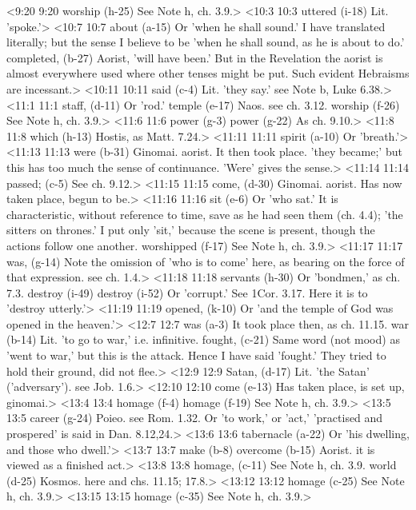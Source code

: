 <9:20 9:20  worship (h-25)  See Note h, ch. 3.9.>
<10:3 10:3  uttered (i-18)  Lit. 'spoke.'>
<10:7 10:7  about (a-15)  Or 'when he shall sound.' I have translated literally; but  the sense I believe to be 'when he shall sound, as he is about  to do.'
  completed, (b-27)  Aorist, 'will have been.' But in the Revelation the aorist is  almost everywhere used where other tenses might be put. Such  evident Hebraisms are incessant.>
<10:11 10:11  said (c-4)  Lit. 'they say.' see Note b, Luke 6.38.>
<11:1 11:1  staff, (d-11)  Or 'rod.'
  temple (e-17)  Naos. see ch. 3.12.
  worship (f-26)  See Note h, ch. 3.9.>
<11:6 11:6  power (g-3)  power (g-22)
  As ch. 9.10.>
<11:8 11:8  which (h-13)  Hostis, as Matt. 7.24.>
<11:11 11:11  spirit (a-10)  Or 'breath.'>
<11:13 11:13  were (b-31)  Ginomai. aorist. It then took place. 'they became;' but  this has too much the sense of continuance. 'Were' gives the  sense.>
<11:14 11:14  passed; (c-5)  See ch. 9.12.>
<11:15 11:15  come, (d-30)  Ginomai. aorist. Has now taken place, begun to be.>
<11:16 11:16  sit (e-6)  Or 'who sat.' It is characteristic, without reference to  time, save as he had seen them (ch. 4.4); 'the sitters on  thrones.' I put only 'sit,' because the scene is present,  though the actions follow one another.
  worshipped (f-17)  See Note h, ch. 3.9.>
<11:17 11:17  was, (g-14)  Note the omission of 'who is to come' here, as bearing on the  force of that expression. see ch. 1.4.>
<11:18 11:18  servants (h-30)  Or 'bondmen,' as ch. 7.3.
  destroy (i-49)  destroy (i-52)
  Or 'corrupt.' See 1Cor. 3.17. Here it is to 'destroy  utterly.'>
<11:19 11:19  opened, (k-10)  Or 'and the temple of God was opened in the heaven.'>
<12:7 12:7  was (a-3)  It took place then, as ch. 11.15.
  war (b-14)  Lit. 'to go to war,' i.e. infinitive.
  fought, (c-21)  Same word (not mood) as 'went to war,' but this is the  attack. Hence I have said 'fought.' They tried to hold their  ground, did not flee.>
<12:9 12:9  Satan, (d-17)  Lit. 'the Satan' ('adversary'). see Job. 1.6.>
<12:10 12:10  come (e-13)  Has taken place, is set up, ginomai.>
<13:4 13:4  homage (f-4)  homage (f-19)
  See Note h, ch. 3.9.>
<13:5 13:5  career (g-24)  Poieo. see Rom. 1.32. Or 'to work,' or 'act,' 'practised  and prospered' is said in Dan. 8.12,24.>
<13:6 13:6  tabernacle (a-22)  Or 'his dwelling, and those who dwell.'>
<13:7 13:7  make (b-8)  overcome (b-15)
  Aorist. it is viewed as a finished act.>
<13:8 13:8  homage, (c-11) See Note h, ch. 3.9.
  world (d-25)  Kosmos. here and chs. 11.15; 17.8.>
<13:12 13:12  homage (c-25) See Note h, ch. 3.9.>
<13:15 13:15  homage (c-35)  See Note h, ch. 3.9.>
